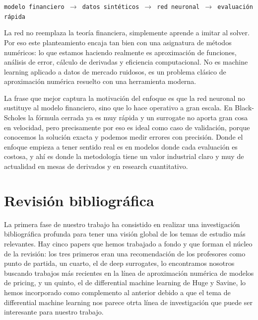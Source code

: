 \documentclass[11pt,a4paper]{article}
\begin{document}
\begin{center}
\texttt{modelo financiero $\rightarrow$ datos sintéticos $\rightarrow$ red neuronal $\rightarrow$ evaluación rápida}
\end{center}

La red no reemplaza la teoría financiera, simplemente aprende a imitar al solver. Por eso este planteamiento encaja tan bien con una asignatura de métodos numéricos: lo que estamos haciendo realmente es aproximación de funciones, análisis de error, cálculo de derivadas y eficiencia computacional. No es machine learning aplicado a datos de mercado ruidosos, es un problema clásico de aproximación numérica resuelto con una herramienta moderna.

La frase que mejor captura la motivación del enfoque es que la red neuronal no sustituye al modelo financiero, sino que lo hace operativo a gran escala. En Black-Scholes la fórmula cerrada ya es muy rápida y un surrogate no aporta gran cosa en velocidad, pero precisamente por eso es ideal como caso de validación, porque conocemos la solución exacta y podemos medir errores con precisión. Donde el enfoque empieza a tener sentido real es en modelos donde cada evaluación es costosa, y ahí es donde la metodología tiene un valor industrial claro y muy de actualidad en mesas de derivados y en research cuantitativo.

\section{Revisión bibliográfica}

La primera fase de nuestro trabajo ha consistido en realizar una investigación bibliográfica profunda para tener una visión global de los temas de estudio más relevantes. Hay cinco papers que hemos trabajado a fondo y que forman el núcleo de la revisión: los tres primeros eran una recomendación de los profesores como punto de partida, un cuarto, el de deep surrogates, lo encontramos nosotros buscando trabajos más recientes en la línea de aproximación numérica de modelos de pricing, y un quinto, el de differential machine learning de Huge y Savine, lo hemos incorporado como complemento al anterior debido a que el tema de differential machine learning nos parece otrta línea de investigación que puede ser interesante para nuestro trabajo.
\end{document}

